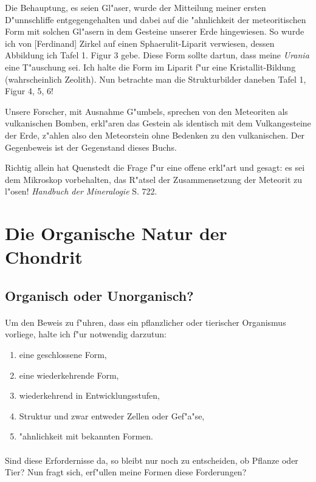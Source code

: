 \documentclass[a4paper, 11pt, oneside]{article}
\begin{document}
Die Behauptung, es seien Gl"aser, wurde der Mitteilung meiner ersten D"unnschliffe entgegengehalten und dabei auf die "ahnlichkeit der meteoritischen Form mit solchen Gl"asern in dem Gesteine unserer Erde hingewiesen. So wurde ich von [Ferdinand] Zirkel auf einen Sphaerulit-Liparit verwiesen, dessen Abbildung ich Tafel 1. Figur 3 gebe. Diese Form sollte dartun, dass meine \emph{Urania} eine T"auschung sei. Ich halte die Form im Liparit f"ur eine Kristallit-Bildung (wahrscheinlich Zeolith). Nun betrachte man die Strukturbilder daneben Tafel 1, Figur 4, 5, 6!

Unsere Forscher, mit Ausnahme G"umbels, sprechen von den Meteoriten als vulkanischen Bomben, erkl"aren das Gestein als identisch mit dem Vulkangesteine der Erde, z"ahlen also den Meteorstein ohne Bedenken zu den vulkanischen. Der Gegenbeweis ist der Gegenstand dieses Buchs.

Richtig allein hat Quenstedt die Frage f"ur eine offene erkl"art und gesagt: es sei dem Mikroskop vorbehalten, das R"atsel der Zusammensetzung der Meteorit zu l"osen! \emph{Handbuch der Mineralogie} S. 722.
\clearpage
\section{Die Organische Natur der Chondrit}
\subsection{Organisch oder Unorganisch?}
\paragraph{}
Um den Beweis zu f"uhren, dass ein pflanzlicher oder tierischer Organismus vorliege, halte ich f"ur notwendig darzutun:
\begin{enumerate}
    \item eine geschlossene Form,
    \item eine wiederkehrende Form,
    \item wiederkehrend in Entwicklungsstufen,
    \item Struktur und zwar entweder Zellen oder Gef"a"se,
    \item "ahnlichkeit mit bekannten Formen.
\end{enumerate}
\paragraph{}
Sind diese Erfordernisse da, so bleibt nur noch zu entscheiden, ob Pflanze oder Tier? Nun fragt sich, erf"ullen meine Formen diese Forderungen?
\end{document}

